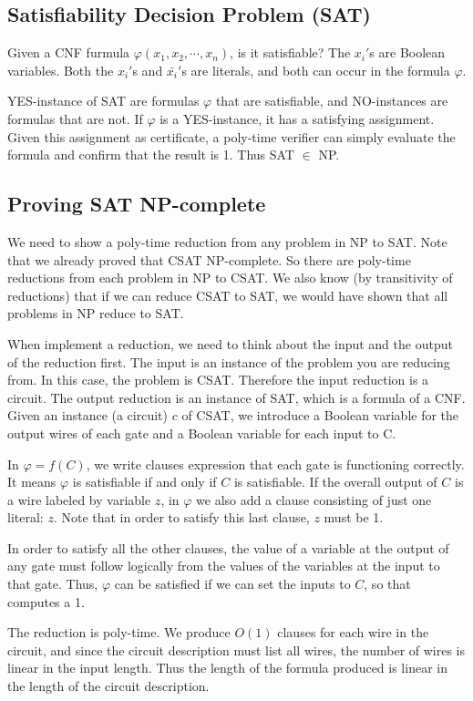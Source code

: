 \subsection{Satisfiability Decision Problem (SAT)}
Given a CNF furmula $\varphi(x_1, x_2, \cdots, x_n)$, is it satisfiable? The $x_i'$s are Boolean variables. Both the $x_i'$s and $\bar{x_i}'$s are literals, and both can occur in the formula $\varphi$.

YES-instance of SAT are formulas $\varphi$ that are satisfiable, and NO-instances are formulas that are not. If $\varphi$ is a YES-instance, it has a satisfying assignment. Given this assignment as certificate, a poly-time verifier can simply evaluate the formula and confirm that the result is 1. Thus SAT $\in$ NP.

\subsection{Proving SAT NP-complete}
We need to show a poly-time reduction from any problem in NP to SAT. Note that we already proved that CSAT NP-complete. So there are poly-time reductions from each problem in NP to CSAT. We also know (by transitivity of reductions) that if we can reduce CSAT to SAT, we would have shown that all problems in NP reduce to SAT.

When implement a reduction, we need to think about the input and the output of the reduction first. The input is an instance of the problem you are reducing from. In this case, the problem is CSAT. Therefore the input reduction is a circuit. The output reduction is an instance of SAT, which is a formula of a CNF. Given an instance (a circuit) $c$ of CSAT, we introduce a Boolean variable for the output wires of each gate and a Boolean variable for each input to C. 

In $\varphi = f(C)$, we write clauses expression that each gate is functioning correctly. It means $\varphi$ is satisfiable if and only if $C$ is satisfiable. If the overall output of $C$ is a wire labeled by variable $z$, in $\varphi$ we also add a clause consisting of just one literal: $z$. Note that in order to satisfy this last clause, $z$ must be 1.

In order to satisfy all the other clauses, the value of a variable at the output of any gate must follow logically from the values of the variables at the input to that gate. Thus, $\varphi$ can be satisfied if we can set the inputs to $C$, so that computes a 1.

The reduction is poly-time. We produce $O(1)$ clauses for each wire in the circuit, and since the circuit description must list all wires, the number of wires is linear in the input length. Thus the length of the formula produced is linear in the length of the circuit description.

